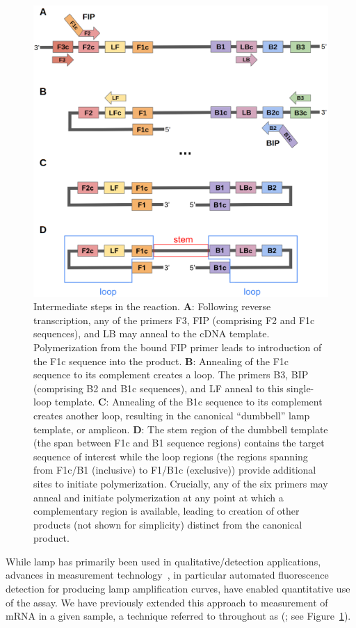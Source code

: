 \documentclass[../thesis.tex]{subfiles}
\begin{document}
\begin{figure}[!tpb] 
\centering
\includegraphics[width=5in]{../figures/chapter2/paper_lamp_fig.png}
\caption{Intermediate steps in the  reaction. \textbf{A}: Following reverse transcription, any of the primers F3, FIP (comprising F2 and F1c sequences), and LB may anneal to the cDNA template. Polymerization from the bound FIP primer leads to introduction of the F1c sequence into the product. \textbf{B}: Annealing of the F1c sequence to its complement creates a loop. The primers B3, BIP (comprising B2 and B1c sequences), and LF anneal to this single-loop template. \textbf{C}: Annealing of the B1c sequence to its complement creates another loop, resulting in the canonical ``dumbbell'' \gls{lamp} template, or amplicon. \textbf{D}: The stem region of the dumbbell template (the span between F1c and B1 sequence regions) contains the target sequence of interest while the loop regions (the regions spanning from F1c/B1 (inclusive) to F1/B1c (exclusive)) provide additional sites to initiate polymerization. Crucially, any of the six primers may anneal and initiate polymerization at any point at which a complementary region is available, leading to creation of other products (not shown for simplicity) distinct from the canonical product.\label{fig:lampoverview}}
\end{figure}
While \gls{lamp} has primarily been used in qualitative/detection applications, advances in measurement technology~\citep{zhang_brief_2014, becherer_loop-mediated_2020}, in particular automated fluorescence detection for producing \gls{lamp} amplification curves, have enabled quantitative use of the assay. We have previously extended this approach to measurement of mRNA in a given sample, a technique referred to throughout as  (\citealp{remmel_diagnostic_2022}; see Figure~\ref{fig:lampoverview}). 
\end{document}
